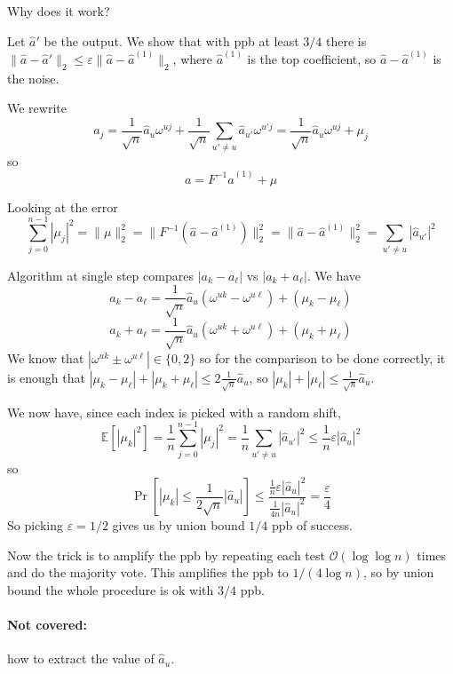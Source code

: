 \documentclass[11pt]{article}
\newcommand{\E}{{\mathbb E}}
\newcommand{\bigo}{\mathcal{O}}
\begin{document}
Why does it work?

Let $\hat{a}'$ be the output. We show that with ppb at least $3/4$ there is $\|\hat{a} - \hat{a}'\|_2 \le \varepsilon \|\hat{a} - \hat{a}^{(1)}\|_2$, where $\hat{a}^{(1)}$ is the top coefficient, so $\hat{a} - \hat{a}^{(1)}$ is the noise.

We rewrite 
$$a_j = \frac{1}{\sqrt{n}}\hat{a}_u \omega^{uj} +  \frac{1}{\sqrt{n}}\sum_{u' \not= u} \hat{a}_{u'} \omega^{u'j} =   \frac{1}{\sqrt{n}}\hat{a}_u \omega^{uj} + \mu_j$$
so
$$a = F^{-1}\hat{a}^{(1)} + \mu$$

Looking at the error
$$\sum_{j=0}^{n-1} |\mu_j|^2 = \|\mu\|_2^2 = \|F^{-1}(\hat{a} - \hat{a}^{(1)})\|_2^2 = \| \hat{a} - \hat{a}^{(1)}\|_2^2 = \sum_{u' \not= u} |\hat{a}_{u'}|^2$$

Algorithm at single step compares $|a_{k} - a_{\ell}|$ vs $|a_{k} + a_\ell|$.
We have
$$a_k - a_\ell = \frac{1}{\sqrt{n}}\hat{a}_u(\omega^{uk} - \omega^{u\ell}) + (\mu_{k} - \mu_{\ell})$$
$$a_k + a_\ell = \frac{1}{\sqrt{n}}\hat{a}_u(\omega^{uk} + \omega^{u\ell}) + (\mu_{k} + \mu_{\ell})$$
We know that $|\omega^{uk} \pm \omega^{u\ell}| \in \{0,2\}$ so for the comparison to be done correctly, it is enough that $|\mu_k - \mu_\ell| + |\mu_k + \mu_\ell| \le 2 \frac{1}{\sqrt{n}} \hat{a}_u$, so $|\mu_k| + |\mu_\ell| \le \frac{1}{\sqrt{n}}\hat{a}_u$. 

We now have, since each index is picked with a random shift,
$$\E[|\mu_k|^2]  = \frac{1}{n} \sum_{j=0}^{n-1} |\mu_j|^2 = \frac{1}{n} \sum_{u' \not= u} |\hat{a}_{u'}|^2 \le \frac{1}{n} \varepsilon |\hat{a}_u|^2$$
so 
$$\Pr[|\mu_k| \le \frac{1}{2 \sqrt{n}} |\hat{a}_u|] \le  \frac{\frac1n \varepsilon |\hat{a}_u|^2}{\frac{1}{4n} |\hat{a}_u|^2} = \frac{\varepsilon}{4}$$
So picking $\varepsilon=1/2$ gives us by union bound $1/4$ ppb of success.

Now the trick is to amplify the ppb by repeating each test $\bigo(\log \log n)$ times and do the majority vote. This amplifies the ppb to $1/(4 \log n)$, so by union bound the whole procedure is ok with $3/4$ ppb.

\paragraph{Not covered:} how to extract the value of $\hat{a}_u$.
\end{document}
